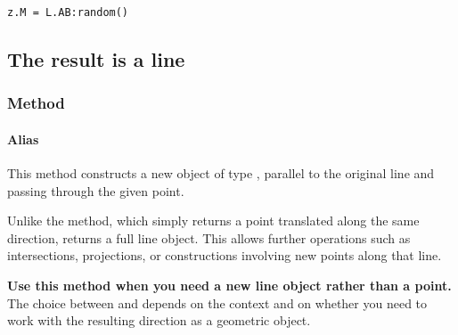 \verb|z.M = L.AB:random()|

\subsection{The result is a line}


\subsubsection{Method } %
\label{ssub_line_from_a_defined_line}

\paragraph*{Alias} 


This method constructs a new object of type , parallel to the original line and passing through the given point.

\medskip
\noindent
Unlike the  method, which simply returns a point translated along the same direction,  returns a full line object. This allows further operations such as intersections, projections, or constructions involving new points along that line.

\medskip
\noindent
\textbf{Use this method when you need a new line object rather than a point.} The choice between  and  depends on the context and on whether you need to work with the resulting direction as a geometric object.

\begin{minipage}{.5\textwidth}
\begin{center}
\end{center}
\end{minipage}
\begin{minipage}{.5\textwidth}
\begin{tkzexample}
\end{tkzexample}
\end{minipage}



